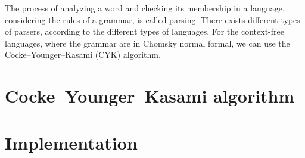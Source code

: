 \documentclass[12pt]{article}
\begin{document}
The process of analyzing a word and checking its membership in a language, considering the rules of a grammar, is called parsing. There exists different types of parsers, according to the different types of languages. For the context-free languages, where the grammar are in Chomsky normal formal, we can use the Cocke–Younger–Kasami (CYK) algorithm. 







\section{Cocke–Younger–Kasami algorithm}\label{sec:cyk}

\section{Implementation}\label{sec:imp}




\end{document}
